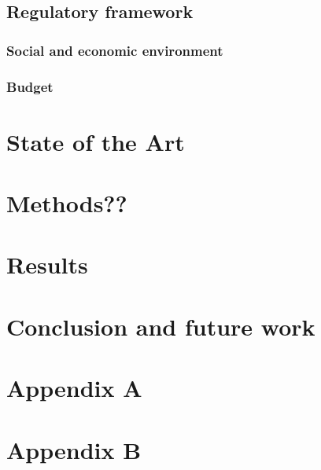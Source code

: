 \documentclass[12pt]{report} %
\begin{document}
\section{Regulatory framework}


\subsection{Social and economic environment}


\subsection{Budget}


\chapter{State of the Art}

\chapter{Methods??}


\chapter{Results}


\chapter{Conclusion and future work}






\clearpage
{}

\printbibliography





\chapter* {Appendix A}

\chapter* {Appendix B}
\end{document}
